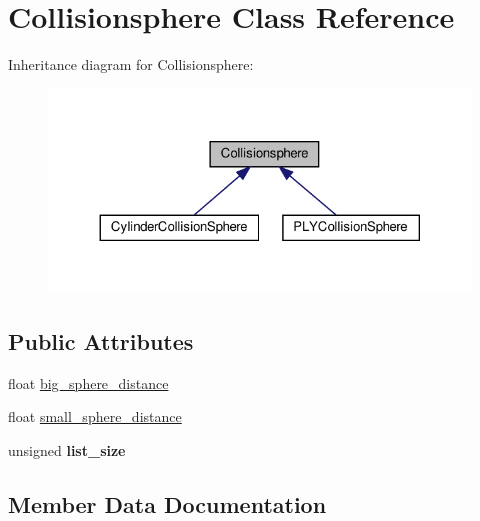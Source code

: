 \hypertarget{class_collisionsphere}{}\section{Collisionsphere Class Reference}
\label{class_collisionsphere}


Inheritance diagram for Collisionsphere\+:
\nopagebreak
\begin{figure}[H]
\begin{center}
\leavevmode
\includegraphics[width=324pt]{class_collisionsphere__inherit__graph}
\end{center}
\end{figure}
\subsection*{Public Attributes}
\begin{DoxyCompactItemize}
\item 
float \hyperlink{class_collisionsphere_a4b791781efcb1af5198b22ea0b542cfb}{big\+\_\+sphere\+\_\+distance}
\item 
float \hyperlink{class_collisionsphere_ae5430c092ea0436edfe0adeb79402ff2}{small\+\_\+sphere\+\_\+distance}
\item 
\mbox{\label{class_collisionsphere_abf63a29c825cdd63ecb86d1dc430a0d4}} 
unsigned {\bfseries list\+\_\+size}
\end{DoxyCompactItemize}


\subsection{Member Data Documentation}
\mbox{\label{class_collisionsphere_a4b791781efcb1af5198b22ea0b542cfb}} 
